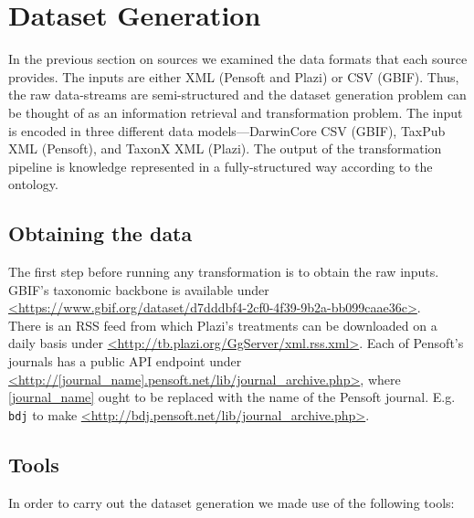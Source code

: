 \section{Dataset Generation}

In the previous section on sources we examined the data formats that each source provides. The inputs are either XML (Pensoft and Plazi) or CSV (GBIF). Thus, the raw data-streams are semi-structured and the dataset generation problem can be thought of as an information retrieval and transformation problem. The input is encoded in three different data models---DarwinCore CSV (GBIF), TaxPub XML (Pensoft), and TaxonX XML (Plazi). The output of the transformation pipeline is  knowledge represented in a fully-structured way according to the ontology.

\subsection{Obtaining the data}

The first step before running any transformation is to obtain the raw inputs. GBIF's taxonomic backbone is available under\\ 
\url{<https://www.gbif.org/dataset/d7dddbf4-2cf0-4f39-9b2a-bb099caae36c>}.\\There is an RSS feed from which Plazi's treatments can be downloaded on a daily basis under \url{<http://tb.plazi.org/GgServer/xml.rss.xml>}. Each of Pensoft's journals has a public API endpoint under \url{<http://[journal_name].pensoft.net/lib/journal_archive.php>}, where \url{[journal_name]} ought to be replaced with the name of the Pensoft journal. E.g. {\tt bdj} to make \url{<http://bdj.pensoft.net/lib/journal_archive.php>}.



\subsection{Tools}

In order to carry out the dataset generation we made use of the following tools:

